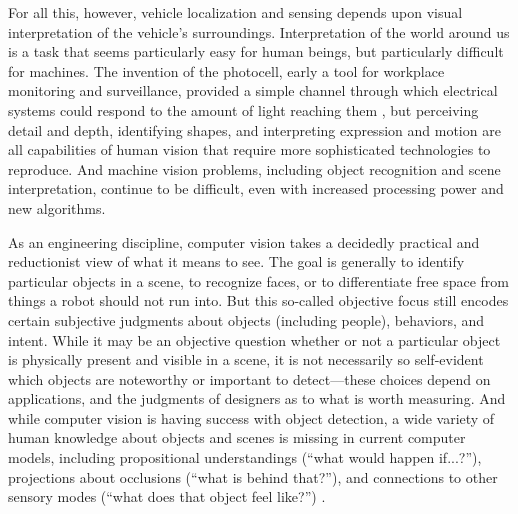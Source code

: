 For all this, however, vehicle localization and sensing depends upon
visual interpretation of the vehicle's surroundings. Interpretation of
the world around us is a task that seems
particularly easy for human beings, but particularly difficult for
machines. The invention of the photocell, early a tool for workplace
monitoring and surveillance, provided a simple channel through which
electrical systems could respond to the amount of light reaching
them \cite[p. 44]{faxed} \cite[p. 361]{nyeElectrifying}, but perceiving detail and
depth, identifying shapes, and interpreting expression and motion are
all capabilities of human vision that require more sophisticated
technologies to reproduce. And machine
vision problems, including object recognition and scene
interpretation, continue to be difficult, even with increased
processing power and new algorithms.

As an engineering discipline, computer vision takes a decidedly
practical and reductionist view of what it means to see. The goal is
generally to identify particular objects in a scene, to recognize
faces, or to differentiate free space from things a robot should
not run into. But this so-called objective focus still encodes
certain subjective judgments about objects (including people),
behaviors, and intent. While it may be an objective question whether or not a
particular object is physically present and visible in
a scene, it is not
necessarily so self-evident which objects are noteworthy or important
to detect---these choices depend on applications, and the judgments of
designers as to what is worth measuring. And while computer vision is having success
with object detection, a wide variety of human knowledge
about objects and scenes is missing in current computer
models, including propositional understandings (``what would happen
if...?''), projections about occlusions (``what is behind that?''),
and 
connections to other sensory modes (``what does that object feel like?'') \cite{gomesJordan}.



